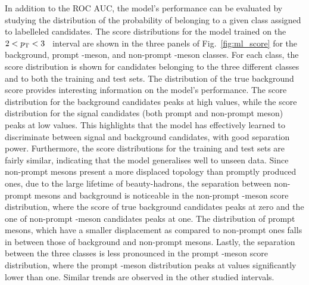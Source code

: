 \begin{sloppypar}
In addition to the ROC AUC, the model's performance can be evaluated by studying the distribution of the probability of belonging to a given class assigned to labelleled candidates. The score distributions for the model trained on the \mbox{$2<p_\mathrm{T}<3$~\gevc} interval are shown in the three panels of Fig.~\ref{fig:ml_score} for the background, prompt \ds-meson, and non-prompt \ds-meson classes. For each class, the score distribution is shown for candidates belonging to the three different classes and to both the training and test sets. The distribution of the true background score provides interesting information on the model's performance. The score distribution for the background candidates peaks at high values, while the score distribution for the signal candidates (both prompt and non-prompt \ds meson) peaks at low values. This highlights that the model has effectively learned to discriminate between signal and background candidates, with good separation power. Furthermore, the score distributions for the training and test sets are fairly similar, indicating that the model generalises well to unseen data. Since non-prompt \ds mesons present a more displaced topology than promptly produced ones, due to the large lifetime of beauty-hadrons, the separation between non-prompt \ds mesons and background is noticeable in the non-prompt \ds-meson score distribution, where the score of true background candidates peaks at zero and the one of non-prompt \ds-meson candidates peaks at one. The distribution of prompt \ds mesons, which have a smaller displacement as compared to non-prompt ones falls in between those of background and non-prompt \ds mesons. Lastly, the separation between the three classes is less pronounced in the prompt \ds-meson score distribution, where the prompt \ds-meson distribution peaks at values significantly lower than one. Similar trends are observed in the other studied \pt intervals. 
\end{sloppypar}

